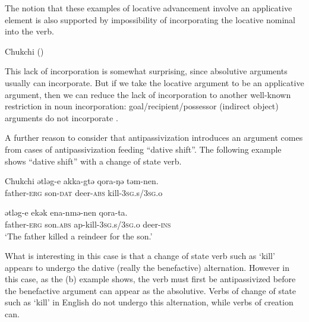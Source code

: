 \documentclass[output=paper,colorlinks,citecolor=brown,modfonts,nonflat]{langsci/langscibook}
\begin{document}
The notion that these examples of locative advancement involve an applicative element is also supported by impossibility of incorporating the locative nominal into the verb.

\largerpage

\ea%
    Chukchi (\citealt{KozinskyNedjalkovPolinskaja1988}) \label{ex:basilico:12}

    \z
    \z

This lack of incorporation is somewhat surprising, since absolutive arguments usually can incorporate. But if we take the locative argument to be an applicative argument, then we can reduce the lack of incorporation to another well-known restriction in noun incorporation: goal/recipient/possessor (indirect object) arguments do not incorporate \citep{Baker1988}.

A further reason to consider that antipassivization introduces an argument comes from cases of antipassivization feeding ``dative shift''. The following example shows ``dative shift'' with a change of state verb.

\ea%
    Chukchi \citep{Spencer1995}\label{ex:basilico:13}
    \ea \label{ex:basilico:13a}
    \gll ǝtlǝg-e  akka-gtǝ  qora-ŋǝ  tǝm-nen.\\
    father{}-\textsc{erg}  son{}-\textsc{dat}  deer{}-\textsc{abs}  kill-\textsc{3sg}.s/\textsc{3sg}.o\\
    \glt

    \ex \label{ex:basilico:13b}
    \gll ǝtlǝg-e  ekǝk    ena-nmǝ-nen    qora-ta. \\
    father-\textsc{erg}  son.\textsc{abs}  ap{}-kill-\textsc{3sg}.s/\textsc{3sg}.o  deer-\textsc{ins}\\
    \glt `The father killed a reindeer for the son.'
    \z
    \z


What is interesting in this case is that a change of state verb such as ‘kill’ appears to undergo the dative (really the benefactive) alternation. However in this case, as the (b) example shows, the verb must first be antipassivized before the benefactive argument can appear as the absolutive. Verbs of change of state such as ‘kill’ in English do not undergo this alternation, while verbs of creation can.
\end{document}
